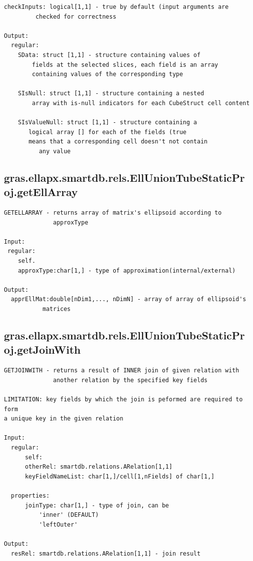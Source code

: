 \documentclass[letterpaper,10pt,english]{sphinxmanual}
\begin{document}
\begin{Verbatim}[commandchars=\\\{\}]
      checkInputs: logical[1,1] - true by default (input arguments are
         checked for correctness

Output:
  regular:
    SData: struct [1,1] - structure containing values of
        fields at the selected slices, each field is an array
        containing values of the corresponding type

    SIsNull: struct [1,1] - structure containing a nested
        array with is-null indicators for each CubeStruct cell content

    SIsValueNull: struct [1,1] - structure containing a
       logical array [] for each of the fields (true
       means that a corresponding cell doesn't not contain
          any value
\end{Verbatim}


\subsection{gras.ellapx.smartdb.rels.EllUnionTubeStaticProj.getEllArray}
\label{chap_functions:gras-ellapx-smartdb-rels-elluniontubestaticproj-getellarray}
\begin{Verbatim}[commandchars=\\\{\}]
GETELLARRAY - returns array of matrix's ellipsoid according to
              approxType

Input:
 regular:
    self.
    approxType:char[1,] - type of approximation(internal/external)

Output:
  apprEllMat:double[nDim1,..., nDimN] - array of array of ellipsoid's
           matrices
\end{Verbatim}


\subsection{gras.ellapx.smartdb.rels.EllUnionTubeStaticProj.getJoinWith}
\label{chap_functions:gras-ellapx-smartdb-rels-elluniontubestaticproj-getjoinwith}
\begin{Verbatim}[commandchars=\\\{\}]
GETJOINWITH - returns a result of INNER join of given relation with
              another relation by the specified key fields

LIMITATION: key fields by which the join is peformed are required to form
a unique key in the given relation

Input:
  regular:
      self:
      otherRel: smartdb.relations.ARelation[1,1]
      keyFieldNameList: char[1,]/cell[1,nFields] of char[1,]

  properties:
      joinType: char[1,] - type of join, can be
          'inner' (DEFAULT)
          'leftOuter'

Output:
  resRel: smartdb.relations.ARelation[1,1] - join result
\end{Verbatim}
\end{document}
